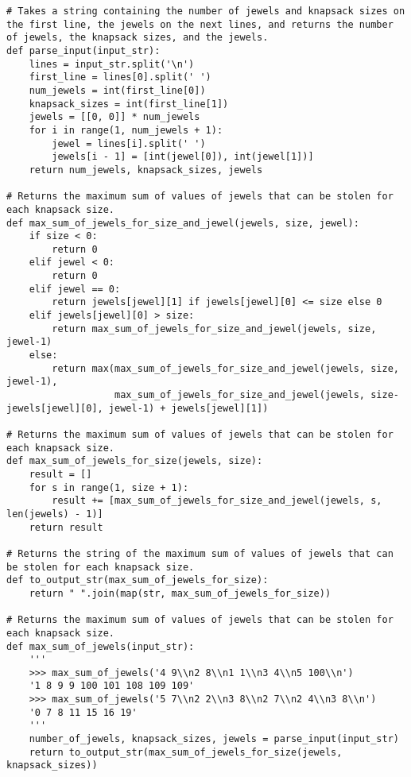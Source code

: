 \begin{figure*}
\begin{lstlisting}
# Takes a string containing the number of jewels and knapsack sizes on the first line, the jewels on the next lines, and returns the number of jewels, the knapsack sizes, and the jewels.
def parse_input(input_str):
    lines = input_str.split('\n')
    first_line = lines[0].split(' ')
    num_jewels = int(first_line[0])
    knapsack_sizes = int(first_line[1])
    jewels = [[0, 0]] * num_jewels
    for i in range(1, num_jewels + 1):
        jewel = lines[i].split(' ')
        jewels[i - 1] = [int(jewel[0]), int(jewel[1])]
    return num_jewels, knapsack_sizes, jewels

# Returns the maximum sum of values of jewels that can be stolen for each knapsack size.
def max_sum_of_jewels_for_size_and_jewel(jewels, size, jewel):
    if size < 0:
        return 0
    elif jewel < 0:
        return 0
    elif jewel == 0:
        return jewels[jewel][1] if jewels[jewel][0] <= size else 0
    elif jewels[jewel][0] > size:
        return max_sum_of_jewels_for_size_and_jewel(jewels, size, jewel-1)
    else:
        return max(max_sum_of_jewels_for_size_and_jewel(jewels, size, jewel-1),
                   max_sum_of_jewels_for_size_and_jewel(jewels, size-jewels[jewel][0], jewel-1) + jewels[jewel][1])

# Returns the maximum sum of values of jewels that can be stolen for each knapsack size.
def max_sum_of_jewels_for_size(jewels, size):
    result = []
    for s in range(1, size + 1):
        result += [max_sum_of_jewels_for_size_and_jewel(jewels, s, len(jewels) - 1)]
    return result

# Returns the string of the maximum sum of values of jewels that can be stolen for each knapsack size.
def to_output_str(max_sum_of_jewels_for_size):
    return " ".join(map(str, max_sum_of_jewels_for_size))

# Returns the maximum sum of values of jewels that can be stolen for each knapsack size.
def max_sum_of_jewels(input_str):
    '''
    >>> max_sum_of_jewels('4 9\\n2 8\\n1 1\\n3 4\\n5 100\\n')
    '1 8 9 9 100 101 108 109 109'
    >>> max_sum_of_jewels('5 7\\n2 2\\n3 8\\n2 7\\n2 4\\n3 8\\n')
    '0 7 8 11 15 16 19'
    '''
    number_of_jewels, knapsack_sizes, jewels = parse_input(input_str)
    return to_output_str(max_sum_of_jewels_for_size(jewels, knapsack_sizes))



\end{lstlisting}
\end{figure*}
